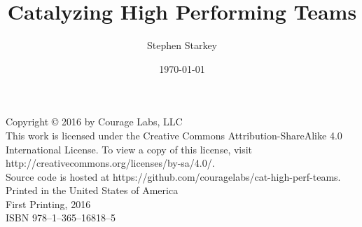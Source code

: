 \documentclass[12pt]{memoir}
\date{\today}
\title{Catalyzing High Performing Teams}
\author{Stephen Starkey}
\begin{document}
\frontmatter

\maketitle

\newpage

\noindent Copyright \copyright{} 2016 by Courage Labs, LLC \\ 

\noindent This work is licensed under the 
Creative Commons Attribution-ShareAlike 4.0 International License. To view a copy of this license, visit 
http://creativecommons.org/licenses/by-sa/4.0/. \\  

\noindent Source code is hosted at https://github.com/couragelabs/cat-high-perf-teams. \\ 

\noindent Printed in the United States of America \\ 

\noindent First Printing, 2016 \\ 

\noindent ISBN 978--1--365--16818--5

\newpage

\setcounter{secnumdepth}{1}
\setcounter{tocdepth}{1}
\tableofcontents
\newpage











\mainmatter




















\end{document}
